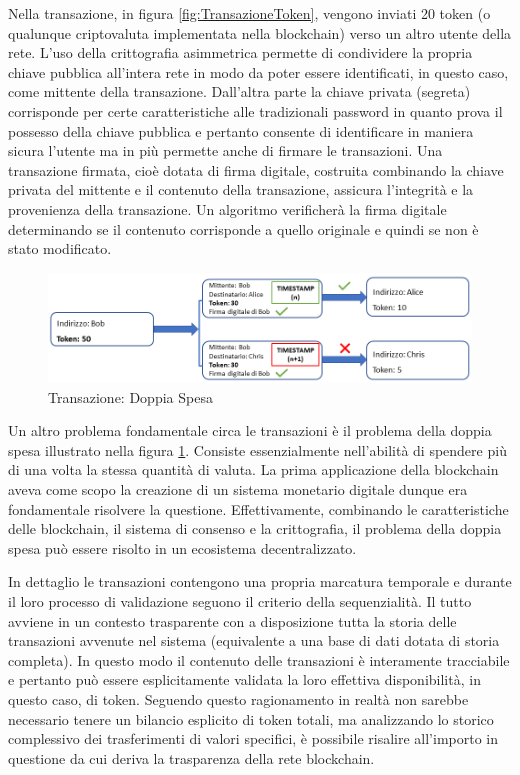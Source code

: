 Nella transazione, in figura \ref{fig:TransazioneToken}, vengono inviati 20 token (o qualunque criptovaluta implementata nella blockchain) verso un altro utente della rete. L’uso della crittografia asimmetrica permette di condividere la propria chiave pubblica all’intera rete in modo da poter essere identificati, in questo caso, come mittente della transazione. Dall’altra parte la chiave privata (segreta) corrisponde per certe caratteristiche alle tradizionali password in quanto prova il possesso della chiave pubblica e pertanto consente di identificare in maniera sicura l’utente ma in più permette anche di firmare le transazioni. Una transazione firmata, cioè dotata di firma digitale, costruita combinando la chiave privata del mittente e il contenuto della transazione, assicura l’integrità e la provenienza della transazione. Un algoritmo verificherà la firma digitale determinando se il contenuto corrisponde a quello originale e quindi se non è stato modificato.
\\

\begin{figure}[H]
\centering
\includegraphics[width=1\textwidth]{immagini/doubleSpend.png}
\caption{Transazione: Doppia Spesa}
\label{fig:TransazioneDoppiaSpesa}
\end{figure}

Un altro problema fondamentale circa le transazioni è il problema della doppia spesa illustrato nella figura \ref{fig:TransazioneDoppiaSpesa}. Consiste essenzialmente nell’abilità di spendere più di una volta la stessa quantità di valuta. La prima applicazione della blockchain aveva come scopo la creazione di un sistema monetario digitale dunque era fondamentale risolvere la questione. Effettivamente, combinando le caratteristiche delle blockchain, il sistema di consenso e la crittografia, il problema della doppia spesa può essere risolto in un ecosistema decentralizzato. 

In dettaglio le transazioni contengono una propria marcatura temporale e durante il loro processo di validazione seguono il criterio della sequenzialità. Il tutto avviene in un contesto trasparente con a disposizione tutta la storia delle transazioni avvenute nel sistema (equivalente a una base di dati dotata di storia completa). In questo modo il contenuto delle transazioni è interamente tracciabile e pertanto può essere esplicitamente validata la loro effettiva disponibilità, in questo caso, di token. Seguendo questo ragionamento in realtà non sarebbe necessario tenere un bilancio esplicito di token totali, ma analizzando lo storico complessivo dei trasferimenti di valori specifici, è possibile risalire all’importo in questione da cui deriva la trasparenza della rete blockchain.

